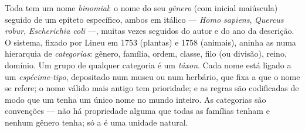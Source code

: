 \begin{definition}\label{def:b1:classifying-biodiversity:nomenclature}
Toda  tem um nome \emph{binomial}: o nome do seu \emph{gênero}
(com inicial maiúscula) seguido de um epíteto específico, ambos em
itálico --- \emph{Homo sapiens}, \emph{Quercus robur},
\emph{Escherichia coli} ---, muitas vezes seguidos do autor e do ano da
descrição. O sistema, fixado por Lineu em 1753 (plantas) e 1758
(animais), aninha as  numa hierarquia de \emph{categorias}:
gênero, família, ordem, classe, filo (ou divisão), reino, domínio. Um
grupo de qualquer categoria é um \emph{táxon}. Cada nome está ligado a
um \emph{espécime-tipo}, depositado num museu ou num herbário, que fixa
a que o nome se refere; o nome válido mais antigo tem prioridade; e as
regras são codificadas de modo que um  tenha um único nome no
mundo inteiro. As categorias são convenções --- não há propriedade
alguma que todas as famílias tenham e nenhum gênero tenha; só a
 é uma unidade natural.
\end{definition}

